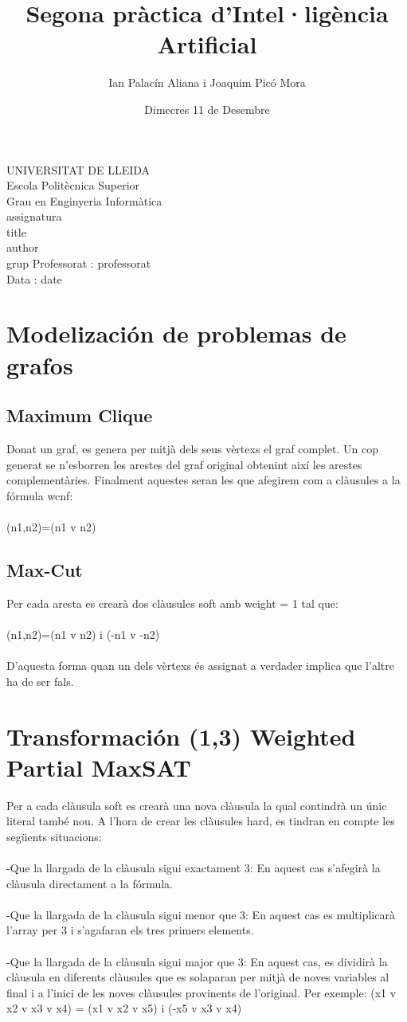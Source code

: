 \documentclass{article}
\title{Segona pràctica d'Intel·ligència Artificial}
\author{Ian Palacín Aliana i Joaquim Picó Mora}
\date{Dimecres 11 de Desembre}
\renewcommand{\maketitle}{ %
    \begin{titlepage}
        \raggedright{UNIVERSITAT DE LLEIDA \\
            Escola Politècnica Superior \\
            Grau en Enginyeria Informàtica\\
            \1assignatura\\}
            \vspace{5cm}
            \centering\huge{\5title \\}
            \vspace{3cm}
            \large{\6author} \\
            \normalsize{\3grup}
            \vfill
            Professorat : \4professorat \\
            Data : \7date
\end{titlepage}}
\begin{document}
\maketitle
\thispagestyle{empty}

\newpage
{}
\tableofcontents
\newpage
{}
%
\section{Modelización de problemas de grafos}
\subsection{Maximum Clique}
Donat un graf, es genera per mitjà dels seus vèrtexs el graf complet. Un cop generat se n'esborren les arestes del graf original obtenint així les arestes complementàries. Finalment aquestes seran les que afegirem com a clàusules a la fórmula wcnf:
\\\\
(n1,n2)=(n1 v n2) 
\subsection{Max-Cut}
Per cada aresta es crearà dos clàusules soft amb weight = 1 tal que:
\\\\
(n1,n2)=(n1 v n2) i (-n1 v -n2)
\\\\
D'aquesta forma quan un dels vèrtexs és assignat a verdader implica que l'altre ha de ser fals.
\section{Transformación (1,3) Weighted Partial MaxSAT}
Per a cada clàusula soft es crearà una nova clàusula la qual contindrà un únic literal també nou. A l'hora de crear les clàusules hard, es tindran en compte les següents situacions:\\\\
-Que la llargada de la clàusula sigui exactament 3: En aquest cas s'afegirà la clàusula directament a la fórmula.\\\\
-Que la llargada de la clàusula sigui menor que 3: En aquest cas es multiplicarà l'array per 3 i s'agafaran els tres primers elements.\\\\
-Que la llargada de la clàusula sigui major que 3: En aquest cas, es dividirà la clàusula en diferents clàusules que es solaparan per mitjà de noves variables al final i a l'inici de les noves clàusules provinents de l'original.
Per exemple: (x1 v x2 v x3 v x4) = (x1 v x2 v x5) i (-x5 v x3 v x4) 
\end{document}
